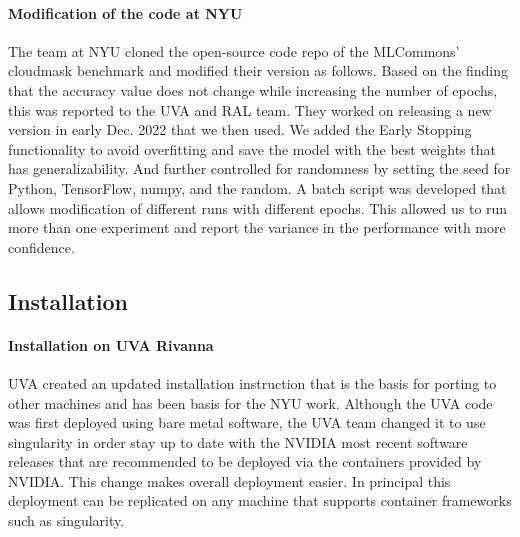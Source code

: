 \documentclass[sigplan,screen]{acmart}
\begin{document}
\paragraph{Modification of the code at NYU} The team at NYU cloned the open-source code \cite{www-mlcommons-science-github} repo of the MLCommons' cloudmask benchmark and modified their version as follows. 
Based on the finding that the accuracy value does not change while increasing the number of epochs, this was reported to the UVA and RAL team. They worked on releasing a new version in early Dec. 2022 that we then used. We added the Early Stopping \cite{Caruana2000OverfittingIN} functionality to avoid overfitting and save the model with the best weights that has generalizability. And further controlled for randomness by setting the seed for Python, TensorFlow, numpy, and the random. A batch script was developed that allows modification of different runs with different epochs. This allowed us to run more than one experiment and report the variance in the performance with more confidence.


\subsection{Installation}
\label{sec:install}

\paragraph{Installation on UVA Rivanna} UVA created an updated installation instruction that is the basis for porting to other machines and has been basis for the NYU work. Although the UVA code was first deployed using bare metal software, the UVA team changed it to use singularity in order stay up to date with the NVIDIA most recent software releases that are recommended to be deployed via the containers provided by NVIDIA. This change makes overall deployment easier. In principal this deployment can be replicated on any machine that supports container frameworks such as singularity.
\end{document}
